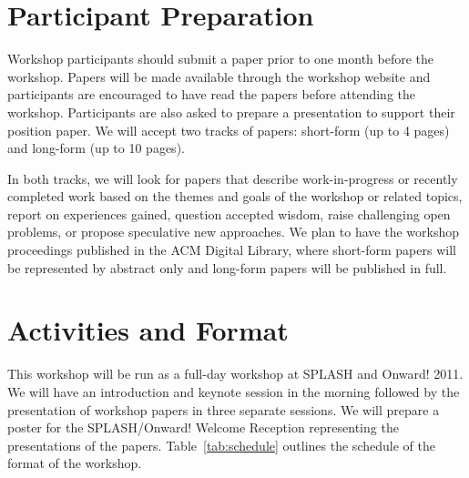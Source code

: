 \documentclass{sigplanconf}
\begin{document}
\section{Participant Preparation}\label{preparation}

Workshop participants should submit a paper prior to one
month before the workshop. Papers will be made available
through the workshop website and participants are encouraged to have
read the papers before attending the workshop. Participants
are also asked to prepare a presentation to support their position
paper. We will accept two tracks of papers: short-form (up to 4 pages) and long-form (up to 10 pages). 

\vfill\eject

In both tracks, we will look for papers that describe work-in-progress or recently completed work based on the themes and goals of the workshop or related topics, report on experiences gained, question accepted wisdom, raise challenging open problems, or propose
speculative new approaches. We plan to have the workshop proceedings published in the ACM Digital Library, where short-form papers will be represented by abstract only and long-form papers will be published in full.

\section{Activities and Format}

This workshop will be run as a full-day workshop at SPLASH and Onward! 2011.  We
will have an introduction and keynote session in the morning followed
by the presentation of workshop papers in three separate sessions. We will prepare a poster for the SPLASH/Onward! Welcome Reception representing the presentations of the papers. Table~\ref{tab:schedule} outlines the schedule of the format of the workshop.
\end{document}

